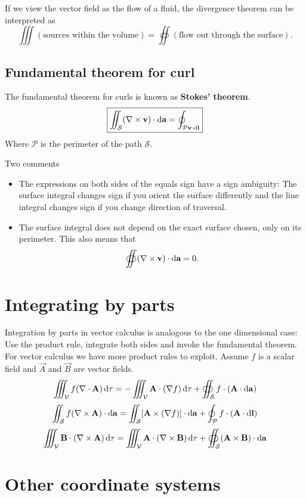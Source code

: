 If we view the vector field as the flow of a fluid, the divergence theorem can be interpreted as
\[ \iiint(\text{sources within the volume}) = \oiint (\text{flow out through the surface}). \]
\subsection{Fundamental theorem for curl}
The fundamental theorem for curls is known as \textbf{Stokes' theorem}.
\[ \boxed{ \iint_{\mathcal{S}}(\mathop{}\! \nabla\times \boldsymbol{\mathrm{v}})\cdot \operatorname{d \!}{\boldsymbol{\mathrm{a}}} = \oint_{\mathcal{P} \boldsymbol{\mathrm{v}}\cdot \operatorname{d \!}{\boldsymbol{\mathrm{l}}}} } \]
Where $\mathcal{P}$ is the perimeter of the path $\mathcal{S}$.

Two comments
\begin{itemize}
\item The expressions on both sides of the equals sign have a sign ambiguity: The surface integral changes sign if you orient the surface differently and the line integral changes sign if you change direction of traversal.
\item The surface integral does not depend on the exact surface chosen, only on its perimeter. This also means that
\[ \oiint(\mathop{}\! \nabla\times \boldsymbol{\mathrm{v}})\cdot \operatorname{d \!}{\boldsymbol{\mathrm{a}}} = 0. \]
\end{itemize}

\section{Integrating by parts}
Integration by parts in vector calculus is analogous to the one dimensional case:
Use the product rule, integrate both sides and invoke the fundamental theorem. For vector calculus we have more product rules to exploit. Assume $f$ is a scalar field and $\vec{A}$ and $\vec{B}$ are vector fields.
\[ \iiint_{\mathcal{V}}f(\nabla\cdot \boldsymbol{\mathrm{A}}) \operatorname{d \!}{\tau} = - \iiint_{\mathcal{V}}\boldsymbol{\mathrm{A}}\cdot(\mathop{}\! \nabla f) \operatorname{d \!}{\tau} + \oiint_{\mathcal{S}}f\cdot (\boldsymbol{\mathrm{A}}\cdot \operatorname{d \!}{\boldsymbol{\mathrm{a}}}) \]
\[ \iint_\mathcal{S} f(\mathop{}\! \nabla\times \boldsymbol{\mathrm{A}})\cdot \operatorname{d \!}{\boldsymbol{\mathrm{a}}} = \iint_\mathcal{S}[\boldsymbol{\mathrm{A}}\times(\mathop{}\! \nabla f)]\cdot \operatorname{d \!}{\boldsymbol{\mathrm{a}}} + \oint_\mathcal{P} f\cdot (\boldsymbol{\mathrm{A}}\cdot \operatorname{d \!}{\boldsymbol{\mathrm{l}}}) \]
\[ \iiint_\mathcal{V} \boldsymbol{\mathrm{B}}\cdot (\mathop{}\! \nabla\times \boldsymbol{\mathrm{A}})\operatorname{d \!}{\tau} = \iiint_\mathcal{V} \boldsymbol{\mathrm{A}}\cdot(\mathop{}\! \nabla\times \boldsymbol{\mathrm{B}})\operatorname{d \!}{\tau} + \oiint_{\mathcal{S}}(\boldsymbol{\mathrm{A}}\times \boldsymbol{\mathrm{B}})\cdot \operatorname{d \!}{\boldsymbol{\mathrm{a}}} \]

\section{Other coordinate systems}

